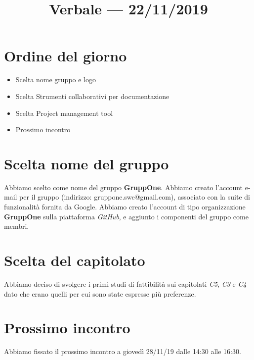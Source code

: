 \documentclass{article}
\title{Verbale --- 22/11/2019}
\begin{document}


\section{Ordine del giorno}%
\label{sec:ordine_del_giorno}

\begin{itemize}
  \item Scelta nome gruppo e logo
  \item Scelta Strumenti collaborativi per documentazione
  \item Scelta Project management tool
  \item Prossimo incontro
\end{itemize}

\section{Scelta nome del gruppo}%
\label{sec:scelta_nome_del_gruppo}

Abbiamo scelto come nome del gruppo \textbf{GruppOne}.
Abbiamo creato l'account e-mail per il gruppo (indirizzo: gruppone.swe@gmail.com), associato con la suite di funzionalità fornita da Google.
Abbiamo creato l'account di tipo organizzazione \textbf{GruppOne} sulla piattaforma \textit{GitHub}, e aggiunto i componenti del gruppo come membri.

\section{Scelta del capitolato}%
\label{sec:scelta_del_capitolato}
Abbiamo deciso di svolgere i primi studi di fattibilità sui capitolati \textit{C5}, \textit{C3} e \textit{C4} dato che erano quelli per cui sono state espresse più preferenze.

\section{Prossimo incontro}%
\label{sec:prossimo_incontro}

Abbiamo fissato il prossimo incontro a giovedì 28/11/19 dalle 14:30 alle 16:30.
\end{document}
